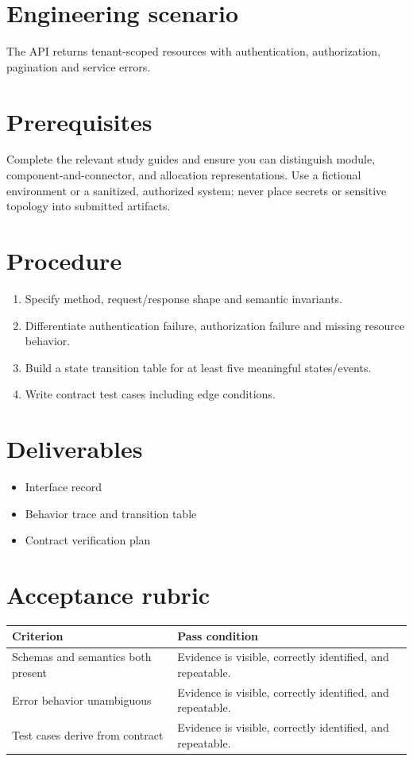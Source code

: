 \documentclass[10pt,letterpaper]{article}
\begin{document}
\DocProvenance
\section{Engineering scenario}
The API returns tenant-scoped resources with authentication, authorization, pagination and service errors.

\section{Prerequisites}
Complete the relevant study guides and ensure you can distinguish module, component-and-connector, and allocation representations. Use a fictional environment or a sanitized, authorized system; never place secrets or sensitive topology into submitted artifacts.

\section{Procedure}
\begin{enumerate}
\item Specify method, request/response shape and semantic invariants.
\item Differentiate authentication failure, authorization failure and missing resource behavior.
\item Build a state transition table for at least five meaningful states/events.
\item Write contract test cases including edge conditions.
\end{enumerate}
\section{Deliverables}
\begin{itemize}
\item Interface record
\item Behavior trace and transition table
\item Contract verification plan
\end{itemize}
\section{Acceptance rubric}
\small
\begin{tabularx}{\linewidth}{@{}YY@{}}
\toprule
\textbf{Criterion} & \textbf{Pass condition} \\
\midrule
Schemas and semantics both present & Evidence is visible, correctly identified, and repeatable. \\
Error behavior unambiguous & Evidence is visible, correctly identified, and repeatable. \\
Test cases derive from contract & Evidence is visible, correctly identified, and repeatable. \\
\bottomrule
\end{tabularx}
\normalsize
\end{document}
